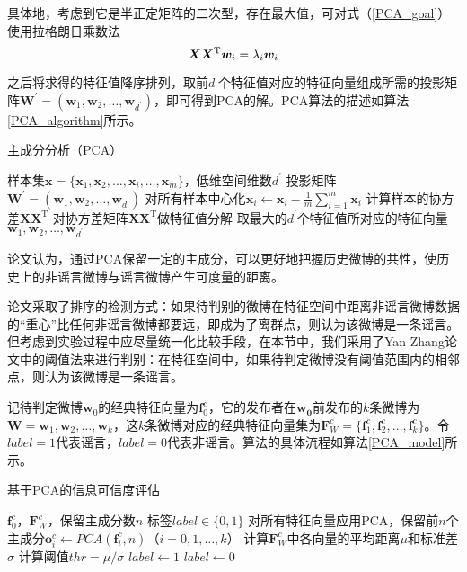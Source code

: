 \documentclass[a4paper,oneside,12pt]{book}
\begin{document}
具体地，考虑到它是半正定矩阵的二次型，存在最大值，可对式（\ref{PCA_goal}）使用拉格朗日乘数法
\begin{equation}
\bm{X}\bm{X}^ \mathrm{ T }\bm{w}_i  = \lambda_i \bm{w}_i \\
\end{equation}

之后将求得的特征值降序排列，取前$d^\prime$个特征值对应的特征向量组成所需的投影矩阵$\bm{W}^\prime =(\bm{w}_1,\bm{w}_2,\ldots,\bm{w}_{d^\prime})$，即可得到PCA的解。PCA算法的描述如算法\ref{PCA_algorithm}所示。
\begin{algorithm} 
\caption{主成分分析（PCA）} 
\label{PCA_algorithm}
\renewcommand{\algorithmicrequire}{\textbf{输入：}}
\renewcommand{\algorithmicensure}{\textbf{输出：}} 
\begin{algorithmic}[1] 
\Require 样本集$\bm{x}=\{\bm{x}_1,\bm{x}_2,\ldots,\bm{x}_i,\ldots,\bm{x}_m\}$，低维空间维数$d^\prime$ 
\Ensure 投影矩阵  $\bm{W}^\prime =(\bm{w}_1,\bm{w}_2,\ldots,\bm{w}_{d^\prime})$
\State 对所有样本中心化$\bm{x}_i \gets \bm{x}_i - \frac{1}{m}\sum_{i=1}^m \bm{x}_i$
\State  计算样本的协方差$\bm{X}\bm{X}^ \mathrm{T}$
\State 对协方差矩阵$\bm{X}\bm{X}^ \mathrm{T}$做特征值分解
\State 取最大的$d^\prime$个特征值所对应的特征向量$\bm{w}_1,\bm{w}_2,\ldots,\bm{w}_{d^\prime}$
\end{algorithmic}  
\end{algorithm}

论文\cite{Chen2016Behavior}认为，通过PCA保留一定的主成分，可以更好地把握历史微博的共性，使历史上的非谣言微博与谣言微博产生可度量的距离。

论文采取了排序的检测方式：如果待判别的微博在特征空间中距离非谣言微博数据的“重心”比任何非谣言微博都要远，即成为了离群点，则认为该微博是一条谣言。但考虑到实验过程中应尽量统一化比较手段，在本节中，我们采用了Yan Zhang论文\cite{Yan2017OneHot}中的阈值法来进行判别：在特征空间中，如果待判定微博没有阈值范围内的相邻点，则认为该微博是一条谣言。

记待判定微博$\bm{w}_0$的经典特征向量为$\bm{f}^{c}_{0}$，它的发布者在$\bm{w_0}$前发布的$k$条微博为$\bm{W} = \bm{w}_1,\bm{w}_2,\ldots,\bm{w}_k$，这$k$条微博对应的经典特征向量集为$\bm{F}^{c}_{W} = \{ \bm{f}^{c}_{1},\bm{f}^{c}_{2},\ldots,\bm{f}^{c}_{k} \}$。令$label = 1$代表谣言，$label = 0$代表非谣言。算法的具体流程如算法\ref{PCA_model}所示。

\begin{algorithm} 
\caption{基于PCA的信息可信度评估} 
\label{PCA_model}
\renewcommand{\algorithmicrequire}{\textbf{输入：}}
\renewcommand{\algorithmicensure}{\textbf{输出：}} 
	\begin{algorithmic}[1] 
	\Require $\bm{f}^{c}_{0}$，$\bm{F}^{c}_{W}$，保留主成分数$n$
	\Ensure 标签$label\in \{0,1\}$
	\State 对所有特征向量应用PCA，保留前$n$个主成分$\bm{o}^{c}_{i} \gets PCA(\bm{f}^{c}_{i}, n)$（$i = 0,1,\ldots,k$）
	\State 计算$\bm{F}^{c}_{W}$中各向量的平均距离$\mu$和标准差$\sigma$
	\State 计算阈值$thr = {\mu} / {\sigma}$
		\State $ label \gets 1 $
	\Else
		\State $ label \gets 0 $
	\EndIf
	\end{algorithmic}
\end{algorithm}
\end{document}
